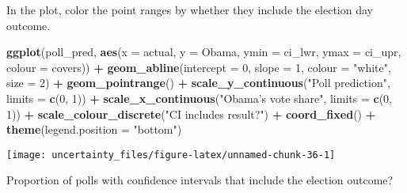 \documentclass[]{book}
\newenvironment{Shaded}{\begin{snugshade}}{\end{snugshade}}
\newcommand{\CommentTok}[1]{\textcolor[rgb]{0.56,0.35,0.01}{\textit{#1}}}
\newcommand{\DataTypeTok}[1]{\textcolor[rgb]{0.13,0.29,0.53}{#1}}
\newcommand{\DecValTok}[1]{\textcolor[rgb]{0.00,0.00,0.81}{#1}}
\newcommand{\KeywordTok}[1]{\textcolor[rgb]{0.13,0.29,0.53}{\textbf{#1}}}
\newcommand{\NormalTok}[1]{#1}
\newcommand{\OperatorTok}[1]{\textcolor[rgb]{0.81,0.36,0.00}{\textbf{#1}}}
\newcommand{\StringTok}[1]{\textcolor[rgb]{0.31,0.60,0.02}{#1}}
\theoremstyle{definition}
\theoremstyle{definition}
\theoremstyle{definition}
\theoremstyle{remark}
\begin{document}
In the plot, color the point ranges by whether they include the election
day outcome.

\begin{Shaded}
\begin{Highlighting}[]
\KeywordTok{ggplot}\NormalTok{(poll_pred, }\KeywordTok{aes}\NormalTok{(}\DataTypeTok{x =}\NormalTok{ actual, }\DataTypeTok{y =}\NormalTok{ Obama,}
                      \DataTypeTok{ymin =}\NormalTok{ ci_lwr, }\DataTypeTok{ymax =}\NormalTok{ ci_upr,}
                      \DataTypeTok{colour =}\NormalTok{ covers)) }\OperatorTok{+}
\StringTok{  }\KeywordTok{geom_abline}\NormalTok{(}\DataTypeTok{intercept =} \DecValTok{0}\NormalTok{, }\DataTypeTok{slope =} \DecValTok{1}\NormalTok{, }\DataTypeTok{colour =} \StringTok{"white"}\NormalTok{, }\DataTypeTok{size =} \DecValTok{2}\NormalTok{) }\OperatorTok{+}
\StringTok{  }\KeywordTok{geom_pointrange}\NormalTok{() }\OperatorTok{+}
\StringTok{  }\KeywordTok{scale_y_continuous}\NormalTok{(}\StringTok{"Poll prediction"}\NormalTok{, }\DataTypeTok{limits =} \KeywordTok{c}\NormalTok{(}\DecValTok{0}\NormalTok{, }\DecValTok{1}\NormalTok{)) }\OperatorTok{+}
\StringTok{  }\KeywordTok{scale_x_continuous}\NormalTok{(}\StringTok{"Obama's vote share"}\NormalTok{, }\DataTypeTok{limits =} \KeywordTok{c}\NormalTok{(}\DecValTok{0}\NormalTok{, }\DecValTok{1}\NormalTok{)) }\OperatorTok{+}
\StringTok{  }\KeywordTok{scale_colour_discrete}\NormalTok{(}\StringTok{"CI includes result?"}\NormalTok{) }\OperatorTok{+}
\StringTok{  }\KeywordTok{coord_fixed}\NormalTok{() }\OperatorTok{+}
\StringTok{  }\KeywordTok{theme}\NormalTok{(}\DataTypeTok{legend.position =} \StringTok{"bottom"}\NormalTok{)}
\end{Highlighting}
\end{Shaded}

\begin{center}\texttt{[image: uncertainty\_files/figure-latex/unnamed-chunk-36-1]} \end{center}

Proportion of polls with confidence intervals that include the election
outcome?

\begin{Shaded}
\end{Shaded}
\end{document}
